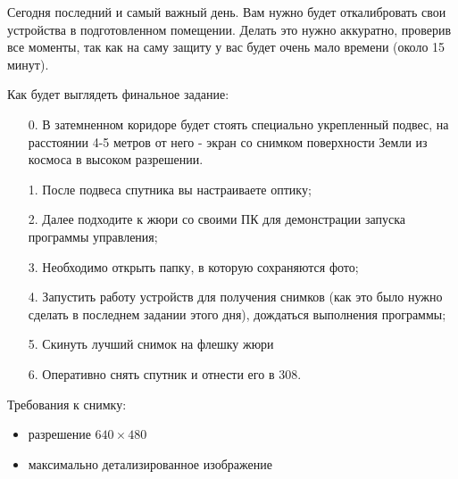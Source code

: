 Сегодня последний и самый важный день. Вам нужно будет откалибровать свои устройства в подготовленном помещении. Делать это нужно аккуратно, проверив все моменты, так как на саму защиту у вас будет очень мало времени (около 15 минут).

Как будет выглядеть финальное задание:
\begin{enumerate}
    \item[0.] В затемненном коридоре будет стоять специально укрепленный подвес, на расстоянии 4-5 метров от него - экран со снимком поверхности Земли из космоса в высоком разрешении.
    \item[1.] После подвеса спутника вы настраиваете оптику;
    \item[2.] Далее подходите к жюри со своими ПК для демонстрации запуска программы управления;
    \item[3.] Необходимо открыть папку, в которую сохраняются фото;
    \item[4.] Запустить работу устройств для получения снимков (как это было нужно сделать в последнем задании этого дня), дождаться выполнения программы;
    \item[5.] Скинуть лучший снимок на флешку жюри
    \item[6.] Оперативно снять спутник и отнести его в 308.
\end{enumerate}

Требования к снимку:
\begin{itemize}
    \item разрешение $640 \times 480$
    \item максимально детализированное изображение
\end{itemize}

\markSection

